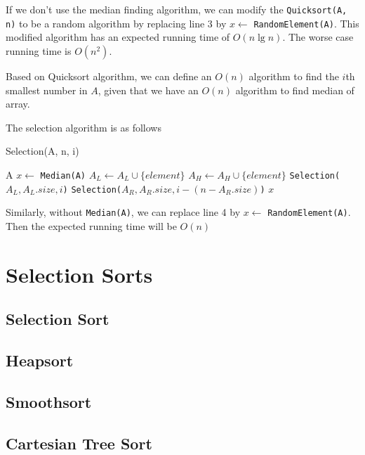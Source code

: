 				If we don't use the median finding algorithm, we can modify the \texttt{Quicksort(A, n)} to be a random algorithm by replacing line 3 by $x \gets$ \texttt{RandomElement(A)}. This modified algorithm has an expected running time of $O(n\lg n)$. The worse case running time is $O(n^2)$.

				Based on Quicksort algorithm, we can define an $O(n)$ algorithm to find the $i$th smallest number in $A$, given that we have an $O(n)$ algorithm to find median of array.

				The selection algorithm is as follows
				\begin{algorithm}[h]
					\caption{Selection(A, n, i)}
					\begin{algorithmic}[1]
							\State \Return A
						\Else
							\State $x \gets$ \texttt{Median(A)}
									\State $A_L \gets A_L \cup \{element\}$
								\Else
									\State $A_H \gets A_H \cup \{element\}$
								\EndIf
							\EndFor
								\State \Return \texttt{Selection($A_L, A_L.size, i$)}
								\State \Return \texttt{Selection($A_R, A_R.size, i - (n - A_R.size)$)}
							\Else
								\State \Return $x$
							\EndIf
						\EndIf
					\end{algorithmic}
				\end{algorithm}

				Similarly, without \texttt{Median(A)}, we can replace line 4 by $x \gets$ \texttt{RandomElement(A)}. Then the expected running time will be $O(n)$

		\section{Selection Sorts}
			\subsection{Selection Sort}

			\subsection{Heapsort}

			\subsection{Smoothsort}

			\subsection{Cartesian Tree Sort}

